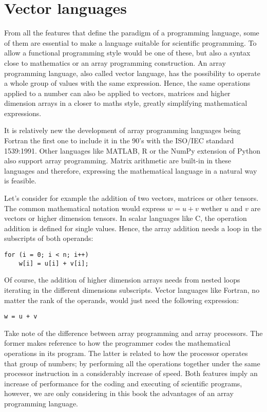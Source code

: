  
    \section{Vector languages} \label{sec:veclan}
 
From all the features that define the paradigm of a programming language, 
some of them are essential to make a language suitable for scientific programming.
To allow a functional programming style would be one of these, 
but also a syntax close to mathematics 
or an array programming construction. 
An array programming language, also called vector language, has the possibility 
to operate a whole group of values with the same expression.
Hence, the same operations applied to a number can also be applied to vectors, matrices and higher dimension arrays
in a closer to maths style, greatly simplifying mathematical expressions.

It is relatively new the development of array programming languages 
being Fortran the first one to include it in the 90's with the ISO/IEC standard 1539:1991. 
Other languages like MATLAB, R or the NumPy extension of Python also support array programming.
Matrix arithmetic are built-in in these languages and therefore, 
expressing the mathematical language in a natural way is feasible.

Let's consider for example the addition of two vectors, matrices or other tensors. 
The common mathematical notation would express $w = u + v$ wether $u$ and $v$ are vectors or higher dimension tensors. 
In scalar languages like C, the operation addition is defined for single values. 
Hence, the array addition needs a loop in the subscripts of both operands:
\vspace{-0.3cm}
\begin{verbatim}
for (i = 0; i < n; i++)
    w[i] = u[i] + v[i];
\end{verbatim}
\vspace{-0.3cm}
Of course, the addition of higher dimension arrays needs from nested loops 
iterating in the different dimensions subscripts. 
Vector languages like Fortran, no matter the rank of the operands, 
would just need the following expression:
\vspace{-0.3cm}
\begin{verbatim}
w = u + v
\end{verbatim}
\vspace{-0.3cm}

Take note of the difference between array programming and array processors. 
The former makes reference to how the programmer codes the mathematical operations in its program. 
The latter is related to how the processor operates that group of numbers; 
by performing all the operations together under the same processor instruction in a considerably increase of speed.
Both features imply an increase of performance for the coding and executing of scientific programs, 
however, we are only considering in this book the advantages of an array programming language.

